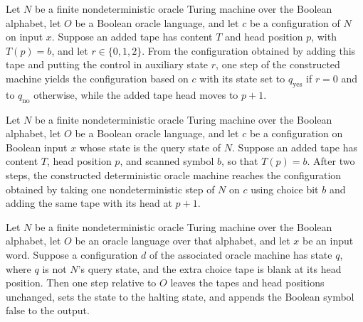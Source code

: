 \begin{theorem}
\label{Turing.oracleChoice_pause}
\leanok
{}
Let $N$ be a finite nondeterministic oracle Turing machine over the Boolean alphabet,
let $O$ be a Boolean oracle language, and let $c$ be a configuration of $N$ on input
$x$. Suppose an added tape has content $T$ and head position $p$, with $T(p)=b$, and let
$r\in\{0,1,2\}$. From the configuration obtained by adding this tape and putting the
control in auxiliary state $r$, one step of the constructed machine yields the
configuration based on $c$ with its state set to $q_{\mathrm{yes}}$ if $r=0$ and to
$q_{\mathrm{no}}$ otherwise, while the added tape head moves to $p+1$.
\end{theorem}

\begin{theorem}
\label{Turing.oracleChoice_queryStep}
\leanok
{}
Let $N$ be a finite nondeterministic oracle Turing machine over the Boolean alphabet,
let $O$ be a Boolean oracle language, and let $c$ be a configuration on Boolean input
$x$ whose state is the query state of $N$. Suppose an added tape has content $T$, head
position $p$, and scanned symbol $b$, so that $T(p)=b$. After two steps, the constructed
deterministic oracle machine reaches the configuration obtained by taking one
nondeterministic step of $N$ on $c$ using choice bit $b$ and adding the same tape with
its head at $p+1$.
\end{theorem}

\begin{theorem}
\label{Turing.oracleChoice_blank}
\leanok
{}
Let $N$ be a finite nondeterministic oracle Turing machine over the Boolean alphabet,
let $O$ be an oracle language over that alphabet, and let $x$ be an input word. Suppose
a configuration $d$ of the associated oracle machine has state $q$, where $q$ is not
$N$’s query state, and the extra choice tape is blank at its head position. Then one
step relative to $O$ leaves the tapes and head positions unchanged, sets the state to
the halting state, and appends the Boolean symbol false to the output.
\end{theorem}

